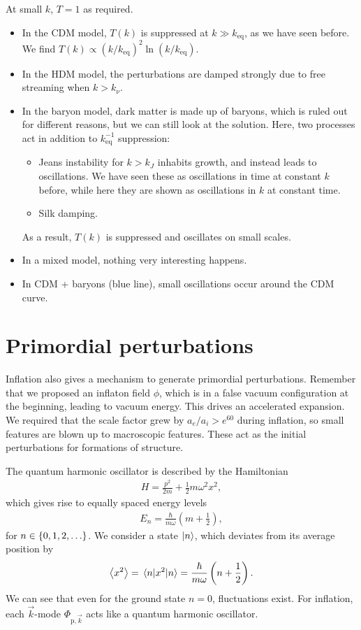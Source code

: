 At small $k$, $T = 1$ as required.
\begin{itemize}
	\item In the CDM model, $T(k)$ is suppressed at $k \gg k_\text{eq}$, as we have seen before. We find $T(k) \propto (k/k_\text{eq})^2 \ln(k/k_\text{eq})$.
	\item In the HDM model, the perturbations are damped strongly due to free streaming when $k > k_\nu$.
	\item In the baryon model, dark matter is made up of baryons, which is ruled out for different reasons, but we can still look at the solution. Here, two processes act in addition to $k_\text{eq}^{-1}$ suppression:
	\begin{itemize}
		\item Jeans instability for $k > k_J$ inhabits growth, and instead leads to oscillations. We have seen these as oscillations in time at constant $k$ before, while here they are shown as oscillations in $k$ at constant time.
		\item Silk damping.
	\end{itemize}
	As a result, $T(k)$ is suppressed and oscillates on small scales.
	\item In a mixed model, nothing very interesting happens.
	\item In CDM + baryons (blue line), small oscillations occur around the CDM curve.
\end{itemize}



\section{Primordial perturbations}
Inflation also gives a mechanism to generate primordial perturbations. Remember that we proposed an inflaton field $\phi$, which is in a false vacuum configuration at the beginning, leading to vacuum energy. This drives an accelerated expansion. We required that the scale factor grew by $a_e/a_i > e^{60}$ during inflation, so small features are blown up to macroscopic features. These act as the initial perturbations for formations of structure.

The quantum harmonic oscillator is described by the Hamiltonian
\begin{align*}
	H = \frac{p^2}{2m} + \frac{1}{2} m \omega^2 x^2,
\end{align*}
which gives rise to equally spaced energy levels
\begin{align*}
	E_n = \frac{\hbar}{m \omega}
	\left( m + \frac{1}{2} \right),
\end{align*}
for $n \in \left\{ {0, 1, 2, \dots} \right\}$. We consider a state $\ket{n}$, which deviates from its average position by
\begin{align*}
	\expval{x^2} = \expval{x^2}{n}
	= \frac{\hbar}{m\omega}
	\left( n + \frac{1}{2} \right).
\end{align*}
We can see that even for the ground state $n=0$, fluctuations exist. For inflation, each $\vec{k}$-mode $\Phi_{\text{p},\vec{k}}$ acts like a quantum harmonic oscillator.

